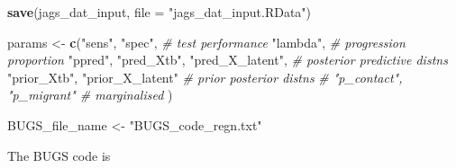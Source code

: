 \documentclass[]{article}
\newenvironment{Shaded}{\begin{snugshade}}{\end{snugshade}}
\newcommand{\CommentTok}[1]{\textcolor[rgb]{0.56,0.35,0.01}{\textit{#1}}}
\newcommand{\DataTypeTok}[1]{\textcolor[rgb]{0.13,0.29,0.53}{#1}}
\newcommand{\DecValTok}[1]{\textcolor[rgb]{0.00,0.00,0.81}{#1}}
\newcommand{\KeywordTok}[1]{\textcolor[rgb]{0.13,0.29,0.53}{\textbf{#1}}}
\newcommand{\NormalTok}[1]{#1}
\newcommand{\StringTok}[1]{\textcolor[rgb]{0.31,0.60,0.02}{#1}}
\begin{document}
\begin{Shaded}
\begin{Highlighting}[]
\KeywordTok{save}\NormalTok{(jags_dat_input, }\DataTypeTok{file =} \StringTok{"jags_dat_input.RData"}\NormalTok{)}

\NormalTok{params <-}\StringTok{ }
\StringTok{  }\KeywordTok{c}\NormalTok{(}\StringTok{"sens"}\NormalTok{, }\StringTok{"spec"}\NormalTok{,                }\CommentTok{# test performance}
    \StringTok{"lambda"}\NormalTok{,                      }\CommentTok{# progression proportion}
    \StringTok{"ppred"}\NormalTok{,}
    \StringTok{"pred_Xtb"}\NormalTok{, }\StringTok{"pred_X_latent"}\NormalTok{,   }\CommentTok{# posterior predictive distns}
    \StringTok{"prior_Xtb"}\NormalTok{, }\StringTok{"prior_X_latent"}  \CommentTok{# prior posterior distns}
    \CommentTok{# "p_contact", "p_migrant"     # marginalised}
\NormalTok{  )}

\NormalTok{BUGS_file_name <-}\StringTok{ "BUGS_code_regn.txt"}
\end{Highlighting}
\end{Shaded}

\begin{Shaded}
\end{Shaded}

The BUGS code is
\end{document}
